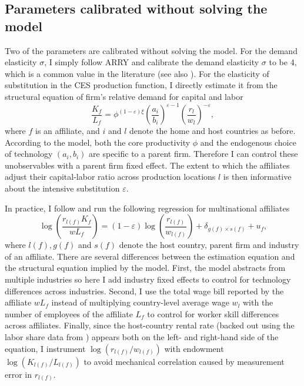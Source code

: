 \documentclass[notitlepage,11pt]{article}%
\begin{document}
\subsection{Parameters calibrated without solving the model}

Two of the parameters are calibrated without solving the model. For the demand
elasticity $\sigma$, I simply follow ARRY and calibrate the demand elasticity
$\sigma$ to be 4, which is a common value in the literature (see also
\cite{bernard_plants_2003}). For the elasticity of substitution in the CES
production function, I directly estimate it from the structural equation of
firm's relative demand for capital and labor%
\[
\frac{K_{f}}{L_{f}}=\phi^{\left(  1-\varepsilon\right)  \xi}\left(
\frac{a_{i}}{b_{i}}\right)  ^{\varepsilon-1}\left(  \frac{r_{l}}{w_{l}%
}\right)  ^{-\varepsilon},
\]
where $f$ is an affiliate, and $i$ and $l$ denote the home and host countries
as before. According to the model, both the core productivity $\phi$ and the
endogenous choice of technology $\left(  a_{i},b_{i}\right)  $ are specific to
a parent firm. Therefore I can control these unobservables with a parent firm
fixed effect. The extent to which the affiliates adjust their capital-labor
ratio across production locations $l$ is then informative about the intensive
substitution $\varepsilon$.

In practice, I follow \cite{oberfield_micro_2014} and run the following
regression for multinational affiliates%
\[
\log\left(  \frac{r_{l\left(  f\right)  }K_{f}}{wL_{f}}\right)  =\left(
1-\varepsilon\right)  \log\left(  \frac{r_{l\left(  f\right)  }}{w_{l\left(
f\right)  }}\right)  +\delta_{g\left(  f\right)  \times s\left(  f\right)
}+u_{f}\text{,}%
\]
where $l\left(  f\right)  ,g\left(  f\right)  $ and $s\left(  f\right)  $
denote the host country, parent firm and industry of an affiliate. There are
several differences between the estimation equation and the structural
equation implied by the model. First, the model abstracts from multiple
industries so here I add industry fixed effects to control for technology
differences across industries. Second, I use the total wage bill reported by
the affiliate $wL_{f}$ instead of multiplying country-level average wage
$w_{l}$ with the number of employees of the affiliate $L_{f}$ to control for
worker skill differences across affiliates. Finally, since the host-country
rental rate (backed out using the labor share data from
\cite{karabarbounis_global_2014}) appears both on the left- and right-hand
side of the equation, I instrument $\log\left(  r_{l\left(  f\right)
}/w_{l\left(  f\right)  }\right)  $ with endowment $\log\left(  K_{l\left(
f\right)  }/L_{l\left(  f\right)  }\right)  $ to avoid mechanical correlation
caused by measurement error in $r_{l\left(  f\right)  }$.
\end{document}
